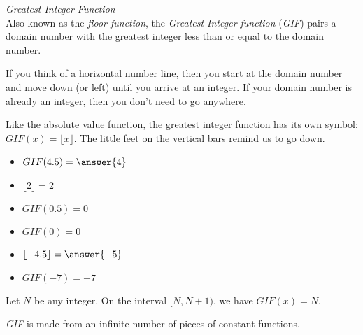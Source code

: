 \documentclass{ximera}
\begin{document}
\begin{example} \textit{Greatest Integer Function} \\
Also known as the \textit{floor function}, the \textit{Greatest Integer function} (\textit{GIF}) pairs a domain number with the greatest integer less than or equal to the domain number.

If you think of a horizontal number line, then you start at the domain number and move down (or left) until you arrive at an integer.  If your domain number is already an integer, then you don't need to go anywhere.


Like the absolute value function, the greatest integer function has its own symbol:  $GIF(x) = \lfloor x \rfloor$. The little feet on the vertical bars remind us to go down.

\begin{itemize}
\item $GIF(4.5) = \answer{4}$
\item $\lfloor 2 \rfloor = 2$
\item $GIF(0.5) = 0$
\item $GIF(0) = 0$
\item $\lfloor -4.5 \rfloor = \answer{-5}$
\item $GIF(-7) = -7$
\end{itemize}




Let $N$ be any integer. On the interval $[N, N+1)$, we have $GIF(x) = N$.

\textit{GIF} is made from an infinite number of pieces of constant functions.







\end{example}
\end{document}
